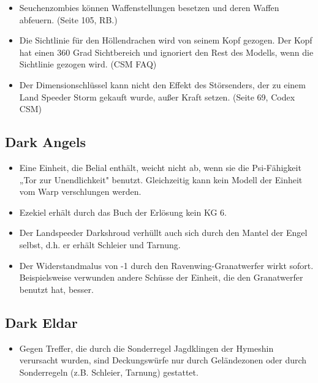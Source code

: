 \begin{itemize}
 \item Seuchenzombies können Waffenstellungen besetzen und deren Waffen
  abfeuern.  (Seite 105, RB.)

 \item Die Sichtlinie für den Höllendrachen wird von seinem Kopf gezogen. Der
  Kopf hat einen 360 Grad Sichtbereich und ignoriert den Rest des Modells, wenn
  die Sichtlinie gezogen wird. (CSM FAQ)

 \item Der Dimensionschlüssel kann nicht den Effekt des Störsenders, der zu
  einem Land Speeder Storm gekauft wurde, außer Kraft setzen. (Seite 69, Codex
  CSM) 

\end{itemize}

\subsection{Dark Angels}

\begin{itemize}

 \item Eine Einheit, die Belial enthält, weicht nicht ab, wenn sie die
  Psi-Fähigkeit „Tor zur Unendlichkeit" benutzt. Gleichzeitig kann kein Modell
  der Einheit vom Warp verschlungen werden.

 \item Ezekiel erhält durch das Buch der Erlösung kein KG 6.

 \item Der Landspeeder Darkshroud verhüllt auch sich durch den Mantel der Engel
  selbst, d.h. er erhält Schleier und Tarnung.

 \item Der Widerstandmalus von -1 durch den Ravenwing-Granatwerfer wirkt sofort.
  Beispielsweise verwunden andere Schüsse der Einheit, die den Granatwerfer
  benutzt hat, besser.

\end{itemize}

\subsection{Dark Eldar}

\begin{itemize}

 \item Gegen Treffer, die durch die Sonderregel Jagdklingen der Hymeshin
  verursacht wurden, sind Deckungswürfe nur durch Geländezonen oder durch
  Sonderregeln (z.B.  Schleier, Tarnung) gestattet.

\end{itemize}

